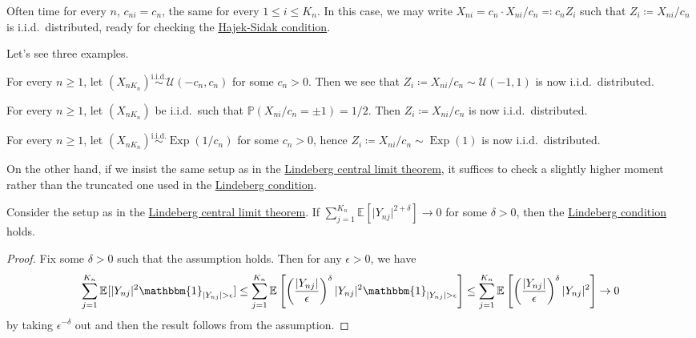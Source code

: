 \begin{intuition}
	Often time for every \(n\), \(c_{ni} = c_n\), the same for every \(1 \leq i \leq K_n\). In this case, we may write \(X_{n i} = c_n \cdot X_{ni} / c_n \eqqcolon c_n Z_i\) such that \(Z_i \coloneqq X_{ni} / c_n\) is i.i.d.\ distributed, ready for checking the \hyperref[thm:Hajek-Sidak-CLT]{Hajek-Sidak condition}.
\end{intuition}

Let's see three examples.

\begin{eg}
	For every \(n \geq 1\), let \((X_{n K_n}) \overset{\text{i.i.d.} }{\sim } \mathcal{U} (-c_n, c_n)\) for some \(c_n > 0\). Then we see that \(Z_i \coloneqq X_{n i} / c_n \sim \mathcal{U} (-1, 1)\) is now i.i.d.\ distributed.
\end{eg}

\begin{eg}
	For every \(n \geq 1\), let \((X_{n K_n})\) be i.i.d.\ such that \(\mathbb{P} (X_{ni} / c_n = \pm 1) = 1 / 2\). Then \(Z_i \coloneqq X_{ni} / c_n\) is now i.i.d.\ distributed.
\end{eg}

\begin{eg}
	For every \(n \geq 1\), let \((X_{n K_n}) \overset{\text{i.i.d.} }{\sim } \operatorname{Exp}(1 / c_n) \) for some \(c_n > 0\), hence \(Z_i \coloneqq X_{ni} / c_n \sim \operatorname{Exp}(1) \) is now i.i.d.\ distributed.
\end{eg}

On the other hand, if we insist the same setup as in the \hyperref[thm:Lindeberg-CLT]{Lindeberg central limit theorem}, it suffices to check a slightly higher moment rather than the truncated one used in the \hyperref[def:Lindeberg-condition]{Lindeberg condition}.

\begin{corollary}\label{thm:Lyopunov-CLT}
	Consider the setup as in the \hyperref[thm:Lindeberg-CLT]{Lindeberg central limit theorem}. If \(\sum_{j=1}^{K_n} \mathbb{E}_{}[\vert Y_{nj} \vert ^{2 + \delta }] \to 0\) for some \(\delta > 0\), then the \hyperref[def:Lindeberg-condition]{Lindeberg condition} holds.
\end{corollary}
\begin{proof}
	Fix some \(\delta > 0\) such that the assumption holds. Then for any \(\epsilon > 0\), we have
	\[
		\sum_{j=1}^{K_n} \mathbb{E}_{}[\vert Y_{nj} \vert ^2 \mathbbm{1}_{\vert Y_{nj} \vert > \epsilon } ]
		\leq \sum_{j=1}^{K_n} \mathbb{E}_{}\left[ \left( \frac{\vert Y_{nj} \vert }{\epsilon } \right) ^\delta \vert Y_{nj} \vert ^2 \mathbbm{1}_{\vert Y_{nj} \vert > \epsilon } \right]
		\leq \sum_{j=1}^{K_n} \mathbb{E}_{}\left[ \left( \frac{\vert Y_{nj} \vert }{\epsilon } \right) ^\delta \vert Y_{nj} \vert ^2 \right]
		\to 0
	\]
	by taking \(\epsilon ^{-\delta }\) out and then the result follows from the assumption.
\end{proof}

